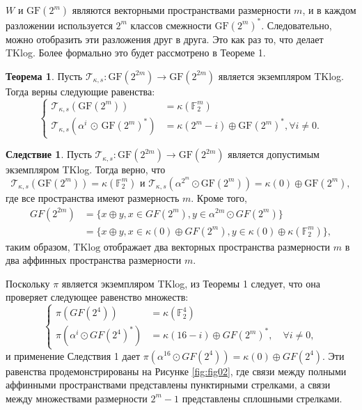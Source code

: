 \(W\) и \(\mathrm{GF}(2^m)\) являются векторными пространствами размерности \(m\), и в каждом разложении используется \(2^m\) классов смежности \(\mathrm{GF}(2^m)^*\). Следовательно, можно отобразить эти разложения друг в друга. Это как раз то, что делает TKlog. Более формально это будет рассмотрено в Теореме 1.

\textbf{Теорема 1}. Пусть \(\mathscr{T}_{\kappa,s} : \mathrm{GF}(2^{2m}) \to \mathrm{GF}(2^{2m})\) является экземпляром TKlog. Тогда верны следующие равенства:
\[
\begin{cases}
  \mathscr{T}_{\kappa,s}(\mathrm{GF}(2^m)) & = \kappa(\mathbb{F}_2^m) \\
  \mathscr{T}_{\kappa,s}(\alpha^i \, \odot \, \mathrm{GF}(2^m)^*) & = \kappa(2^m - i) \oplus \mathrm{GF}(2^m)^*, \forall i \neq 0.
\end{cases}
\]

\textbf{Следствие 1}. Пусть \(\mathscr{T}_{\kappa,s} : \mathrm{GF}(2^{2m}) \to \mathrm{GF}(2^{2m})\) является допустимым экземпляром TKlog. Тогда верно, что
\[
  \mathscr{T}_{\kappa,s}(\mathrm{GF}(2^m)) = \kappa(\mathbb{F}_2^m) \text{ и } \mathscr{T}_{\kappa,s}(\alpha^{2^m} \odot \mathrm{GF}(2^m)) = \kappa(0) \oplus \mathrm{GF}(2^m),
\] где все пространства имеют размерность \( m \). Кроме того,
\begin{align*}
GF(2^{2m}) & = \{ x \oplus y, x \in GF(2^m), y \in \alpha^{2m} \odot GF(2^m) \} \\
& = \{ x \oplus y, x \in \kappa(0) \oplus GF(2^m), y \in \kappa(0) \oplus \kappa (\mathbb{F}_{2}^{m}) \},
\end{align*}
таким образом, \( \text{TKlog} \) отображает два векторных пространства размерности \( m \) в два аффинных пространства размерности \( m \).

Поскольку \( \pi \) является экземпляром TKlog, из Теоремы 1 следует, что она проверяет следующее равенство множеств:
\[
  \begin{cases}
\pi\left( GF(2^4) \right) & = \kappa(\mathbb{F}_{2}^{4}) \\
\pi\left( \alpha^i \odot GF(2^4)^{\ast} \right) & = \kappa(16 - i) \oplus GF(2^m)^{\ast}, \quad \forall i \neq 0,
  \end{cases}
\]
и применение Следствия 1 дает \(\pi(\alpha^{16} \odot GF(2^4)) = \kappa(0) \oplus GF(2^4)\). Эти равенства продемонстрированы на Рисунке \ref{fig:fig02}, где связи между полными аффинными пространствами представлены пунктирными стрелками, а связи между множествами размерности \(2^m - 1\) представлены сплошными стрелками.

